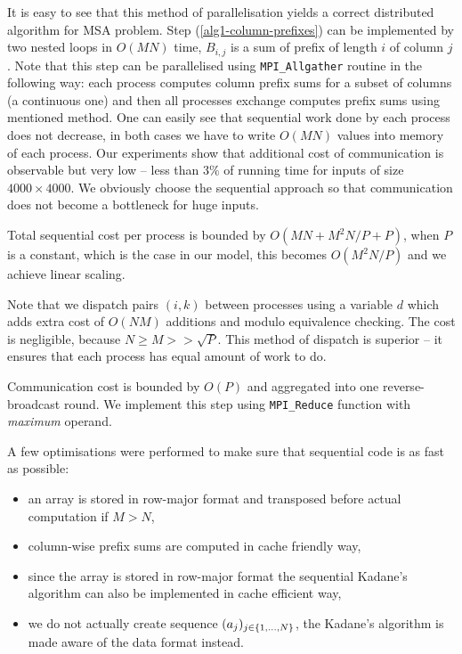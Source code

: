 It is easy to see that this method of parallelisation yields a correct distributed algorithm for MSA problem.
Step (\ref{alg1-column-prefixes}) can be implemented by two nested loops in $O(MN)$ time, $B_{i, j}$ is a sum of prefix of length $i$ of column $j$.
Note that this step can be parallelised using \verb+MPI_Allgather+ routine in the following way: each process computes column prefix sums for a subset of columns (a continuous one) and then all processes exchange computes prefix sums using mentioned method.
One can easily see that sequential work done by each process does not decrease, in both cases we have to write $O(MN)$ values into memory of each process.
Our experiments show that additional cost of communication is observable but very low -- less than $3\%$ of running time for inputs of size $4000 \times 4000$.
We obviously choose the sequential approach so that communication does not become a bottleneck for huge inputs.

Total sequential cost per process is bounded by $O(MN + M^2N / P + P)$, when $P$ is a constant, which is the case in our model, this becomes $O(M^2N / P)$ and we achieve linear scaling.

Note that we dispatch pairs $(i, k)$ between processes using a variable $d$ which adds extra cost of $O(NM)$ additions and modulo equivalence checking.
The cost is negligible, because $N \geq M >> \sqrt{P}$.
This method of dispatch is superior -- it ensures that each process has equal amount of work to do.

Communication cost is bounded by $O(P)$ and aggregated into one reverse-broadcast round.
We implement this step using \verb+MPI_Reduce+ function with \emph{maximum} operand.

A few optimisations were performed to make sure that sequential code is as fast as possible:
\begin{itemize}
    \item an array is stored in row-major format and transposed before actual computation if $M > N$,
    \item column-wise prefix sums are computed in cache friendly way,
    \item since the array is stored in row-major format the sequential Kadane's algorithm can also be implemented in cache efficient way,
    \item we do not actually create sequence $(a_j)_{j \in \{ 1, \dots, N \}}$, the Kadane's algorithm is made aware of the data format instead.
\end{itemize}

